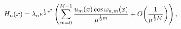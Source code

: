 \[\mathop{H_{n}\/}\nolimits\!\left(x\right)=\lambda_{n}e^{\frac{1}{2}x^{2}}\left%
(\sum_{m=0}^{M-1}\frac{u_{m}(x)\mathop{\cos\/}\nolimits\omega_{n,m}(x)}{\mu^{%
\frac{1}{2}m}}+\mathop{O\/}\nolimits\!\left(\frac{1}{\mu^{\frac{1}{2}M}}\right%
)\right),\]
